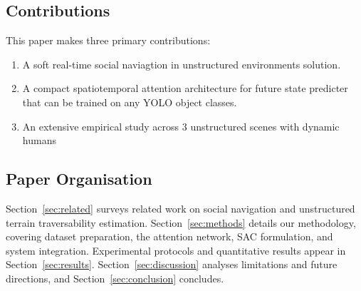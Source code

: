 
\subsection{Contributions}
This paper makes three primary contributions:
\begin{enumerate}
  \item A soft real-time social naviagtion in unstructured environments solution.
  \item A compact spatiotemporal attention architecture for future state predicter that can be trained on any YOLO object classes.  
  \item An extensive empirical study across \num{3} unstructured scenes with dynamic humans
\end{enumerate}

\subsection{Paper Organisation}
Section~\ref{sec:related} surveys related work on social navigation and unstructured terrain traversability estimation.  Section~\ref{sec:methods} details our methodology, covering dataset preparation, the attention network, SAC formulation, and system integration.  Experimental protocols and quantitative results appear in Section~\ref{sec:results}.  Section~\ref{sec:discussion} analyses limitations and future directions, and Section~\ref{sec:conclusion} concludes.
